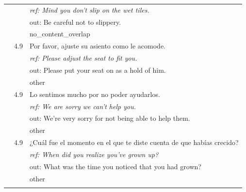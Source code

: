 \begin{longtable}{@{}rp{0.7cm}p{11cm}@{}}
& & \small\itshape ref: Mind you don't slip on the wet tiles. \\
& & \small\ttfamily out: Be careful not to slippery. \\
& & \scriptsize no\_content\_overlap \\\addlinespace
18 & 4.9 & \small Por favor, ajuste su asiento como le acomode. \\
& & \small\itshape ref: Please adjust the seat to fit you. \\
& & \small\ttfamily out: Please put your seat on as a hold of him. \\
& & \scriptsize other \\\addlinespace
19 & 4.9 & \small Lo sentimos mucho por no poder ayudarlos. \\
& & \small\itshape ref: We are sorry we can't help you. \\
& & \small\ttfamily out: We're very sorry for not being able to help them. \\
& & \scriptsize other \\\addlinespace
20 & 4.9 & \small ¿Cuál fue el momento en el que te diste cuenta de que habías crecido? \\
& & \small\itshape ref: When did you realize you've grown up? \\
& & \small\ttfamily out: What was the time you noticed that you had grown? \\
& & \scriptsize other \\\addlinespace
\bottomrule
\end{longtable}
